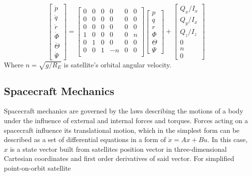     \begin{equation}
        \begin{bmatrix}
        \dot{p} \\
        \dot{q} \\
        \dot{r} \\
        \dot{\Phi} \\
        \dot{\Theta} \\
        \dot{\Psi}
        \end{bmatrix}
        =
        \begin{bmatrix}
            0 & 0 & 0 & 0 & 0 & 0 \\
            0 & 0 & 0 & 0 & 0 & 0 \\
            0 & 0 & 0 & 0 & 0 & 0 \\
            1 & 0 & 0 & 0 & 0 & n \\
            0 & 1 & 0 & 0 & 0 & 0 \\
            0 & 0 & 1 & -n & 0 & 0 \\ 
        \end{bmatrix}
        \begin{bmatrix}
            p \\
            q \\
            r \\
            \Phi \\
            \Theta \\
            \Psi
        \end{bmatrix}
        +
        \begin{bmatrix}
            Q_x/I_x \\
            Q_y/I_x \\
            Q_z/I_z \\
            0 \\
            n \\
            0
            \end{bmatrix}
    \end{equation}\label{eqn:ssrotation}
    Where $n=\sqrt{g/R_E}$ is satellite's orbital angular velocity.

\subsection{Spacecraft Mechanics}\label{sec:space_mechanics}
    Spacecraft mechanics are governed by the laws describing the motions of a body under the influence of external and internal forces and torques. Forces acting on a spacecraft influence its translational motion, which in the simplest form can be described as a set of differential equations in a form of $\dot{x} = Ax + Bu$. In this case, $x$ is a state vector built from satellites position vector in three-dimensional Cartesian coordinates and first order derivatives of said vector. For simplified point-on-orbit satellite 

